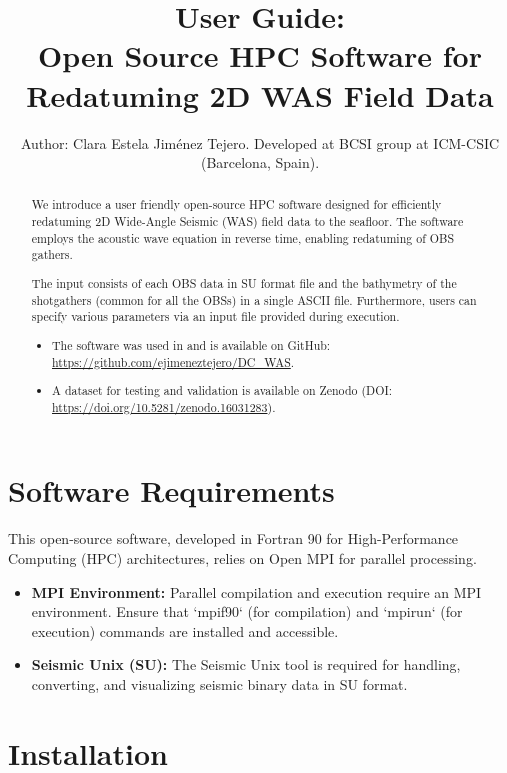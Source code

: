 \documentclass[11pt, oneside]{article}   	%
\title{User Guide: \\Open Source HPC Software for Redatuming 2D WAS Field Data}
\author{Author: Clara Estela Jim\'enez Tejero. Developed at BCSI group at ICM-CSIC (Barcelona, Spain).}
\date{}							%
\begin{document}
\maketitle
\begin{abstract}

We introduce a user friendly open-source HPC software designed for efficiently redatuming 2D Wide-Angle Seismic (WAS) field data to the seafloor. The software employs the acoustic wave equation in reverse time, enabling redatuming of OBS gathers.

The input consists of each OBS data in SU format file and the bathymetry of the shotgathers (common for all the OBSs) in a single ASCII file. Furthermore, users can specify various parameters via an input file provided during execution.

\begin{itemize}
    \item The software was used in \cite{estela} and is available on GitHub: \url{https://github.com/ejimeneztejero/DC_WAS}.
    \item A dataset for testing and validation is available on Zenodo \cite{estela2} (DOI: \url{https://doi.org/10.5281/zenodo.16031283}).
\end{itemize}
\end{abstract}

\section{Software Requirements}\label{sec1}

This open-source software, developed in Fortran 90 for High-Performance Computing (HPC) architectures, relies on Open MPI for parallel processing.

\begin{itemize}
    \item \textbf{MPI Environment:} Parallel compilation and execution require an MPI environment. Ensure that `mpif90` (for compilation) and `mpirun` (for execution) commands are installed and accessible.
    \item \textbf{Seismic Unix (SU):} The Seismic Unix tool \cite{SU} is required for handling, converting, and visualizing seismic binary data in SU format.
\end{itemize}


\section{Installation}\label{sec2}
\end{document}
